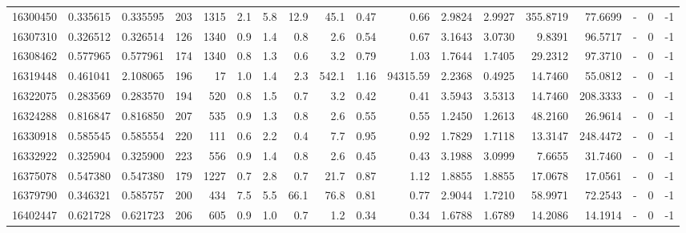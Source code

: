 \begin{tabular}{rrrrrrrrrrrrrrrlrr}
  16300450 & 0.335615 &   0.335595 &  203 & 1315 &      2.1 &      5.8 &    12.9 &     45.1 &       0.47 &        0.66 &  2.9824 &  2.9927 &  355.8719 &   77.6699 &             - &        0 &         -1 \\
  16307310 & 0.326512 &   0.326514 &  126 & 1340 &      0.9 &      1.4 &     0.8 &      2.6 &       0.54 &        0.67 &  3.1643 &  3.0730 &    9.8391 &   96.5717 &             - &        0 &         -1 \\
  16308462 & 0.577965 &   0.577961 &  174 & 1340 &      0.8 &      1.3 &     0.6 &      3.2 &       0.79 &        1.03 &  1.7644 &  1.7405 &   29.2312 &   97.3710 &             - &        0 &         -1 \\
  16319448 & 0.461041 &   2.108065 &  196 &   17 &      1.0 &      1.4 &     2.3 &    542.1 &       1.16 &    94315.59 &  2.2368 &  0.4925 &   14.7460 &   55.0812 &             - &        0 &         -1 \\
  16322075 & 0.283569 &   0.283570 &  194 &  520 &      0.8 &      1.5 &     0.7 &      3.2 &       0.42 &        0.41 &  3.5943 &  3.5313 &   14.7460 &  208.3333 &             - &        0 &         -1 \\
  16324288 & 0.816847 &   0.816850 &  207 &  535 &      0.9 &      1.3 &     0.8 &      2.6 &       0.55 &        0.55 &  1.2450 &  1.2613 &   48.2160 &   26.9614 &             - &        0 &         -1 \\
  16330918 & 0.585545 &   0.585554 &  220 &  111 &      0.6 &      2.2 &     0.4 &      7.7 &       0.95 &        0.92 &  1.7829 &  1.7118 &   13.3147 &  248.4472 &             - &        0 &         -1 \\
  16332922 & 0.325904 &   0.325900 &  223 &  556 &      0.9 &      1.4 &     0.8 &      2.6 &       0.45 &        0.43 &  3.1988 &  3.0999 &    7.6655 &   31.7460 &             - &        0 &         -1 \\
  16375078 & 0.547380 &   0.547380 &  179 & 1227 &      0.7 &      2.8 &     0.7 &     21.7 &       0.87 &        1.12 &  1.8855 &  1.8855 &   17.0678 &   17.0561 &             - &        0 &         -1 \\
  16379790 & 0.346321 &   0.585757 &  200 &  434 &      7.5 &      5.5 &    66.1 &     76.8 &       0.81 &        0.77 &  2.9044 &  1.7210 &   58.9971 &   72.2543 &             - &        0 &         -1 \\
  16402447 & 0.621728 &   0.621723 &  206 &  605 &      0.9 &      1.0 &     0.7 &      1.2 &       0.34 &        0.34 &  1.6788 &  1.6789 &   14.2086 &   14.1914 &             - &        0 &         -1 \\

\end{tabular}
